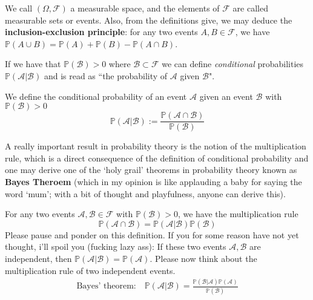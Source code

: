 \begin{remark}
   We call $\left( \Omega, \mathcal{F}\right)$ a measurable space, and the elements of $\mathcal{F}$ are called measurable sets or events. Also, from the definitions give, we may deduce the
   \textbf{inclusion-exclusion principle}: for any two events $A, B \in \mathcal{F}$, we have $\mathbb{P}(A \cup B) = \mathbb{P}(A) + \mathbb{P}(B) - \mathbb{P}(A \cap B)$.
\end{remark}

\vspace{0.2cm}

If we have that $\mathbb{P}(\mathcal{B}) > 0$ where $\mathcal{B} \subset \mathcal{F}$ we can define \textit{conditional} probabilities $\mathbb{P}(\mathcal{A} \vert \mathcal{B})$ and is read as ``the probability of $\mathcal{A}$ given $\mathcal{B}$".

\begin{definition}
   We define the conditional probability of an event $\mathcal{A}$ given an event $\mathcal{B}$ with $\mathbb{P}(\mathcal{B}) > 0$
   $$\mathbb{P}(\mathcal{A} \vert \mathcal{B}) := \frac{\mathbb{P}(\mathcal{A} \cap \mathcal{B})}{\mathbb{P}(\mathcal{B})}$$
\end{definition}

\vspace{0.2cm}

A really important result in probability theory is the notion of the multiplication rule, which is a direct consequence of the definition of conditional probability and one may derive
one of the `holy grail' theorems in probability theory known as \textbf{Bayes Theroem} (which in my opinion is like applauding a baby for saying the word `mum'; with a bit of thought and playfulness, anyone can derive this).

\begin{remark}
   For any two events $\mathcal{A}, \mathcal{B} \in \mathcal{F}$ with $\mathbb{P}(\mathcal{B}) > 0$, we have the multiplication rule
   $$\mathbb{P}(\mathcal{A} \cap \mathcal{B}) = \mathbb{P}(\mathcal{A} \vert \mathcal{B}) \mathbb{P}(\mathcal{B})$$ Please pause and ponder on this definition. If you for some reason have not yet thought, i'll spoil you (fucking lazy ass):
   If these two events $\mathcal{A}, \mathcal{B}$ are independent, then $\mathbb{P}(\mathcal{A} \vert \mathcal{B}) = \mathbb{P}(\mathcal{A})$. Please now think about the multiplication rule of two independent events.
   \begin{align}
   \text{Bayes' theorem:} \quad \mathbb{P}(\mathcal{A} \vert \mathcal{B}) = \frac{\mathbb{P}(\mathcal{B} \vert \mathcal{A}) \mathbb{P}(\mathcal{A})}{\mathbb{P}(\mathcal{B})}
   \end{align}
\end{remark}

